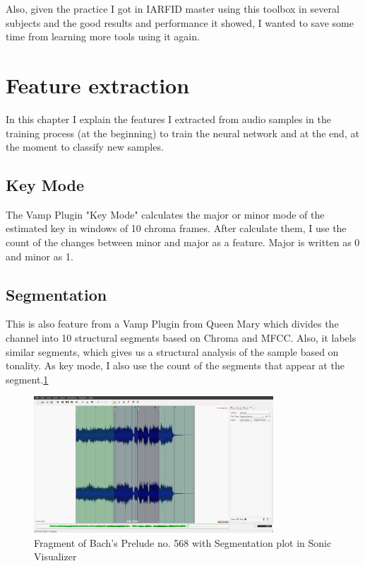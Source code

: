 \documentclass[a4paper,openany,oneside,12pt]{book}
\begin{document}
Also, given the practice I got in IARFID master using this toolbox in several subjects and the good results and performance it showed, I wanted to save some time from learning more tools using it again.



\section{Feature extraction}\label{sec:feature_extraction}
In this chapter I explain the features I extracted from audio samples in the training process (at the beginning) to train the neural network and at the end, at the moment to classify new samples.


\subsection{Key Mode}\label{subsec:keymode}
The Vamp Plugin "Key Mode" calculates the major or minor mode of the estimated key in windows of 10 chroma frames. After calculate them, I use the count of the changes between minor and major as a feature. Major is written as 0 and minor as 1.

\subsection{Segmentation}\label{subsec:segmentation}
This is also feature from a Vamp Plugin from Queen Mary which divides the channel into 10 structural segments based on Chroma and MFCC. Also, it labels similar segments, which gives us a structural analysis of the sample based on tonality. As key mode, I also use the count of the segments that appear at the segment.\ref{fig:sonic}

\begin{figure}
\centering
\includegraphics[width=0.8\textwidth]{img/segmentation.png} 
\caption{Fragment of Bach's Prelude no. 568 with Segmentation plot in Sonic Visualizer} \label{fig:sonic}
\end{figure}
\end{document}

